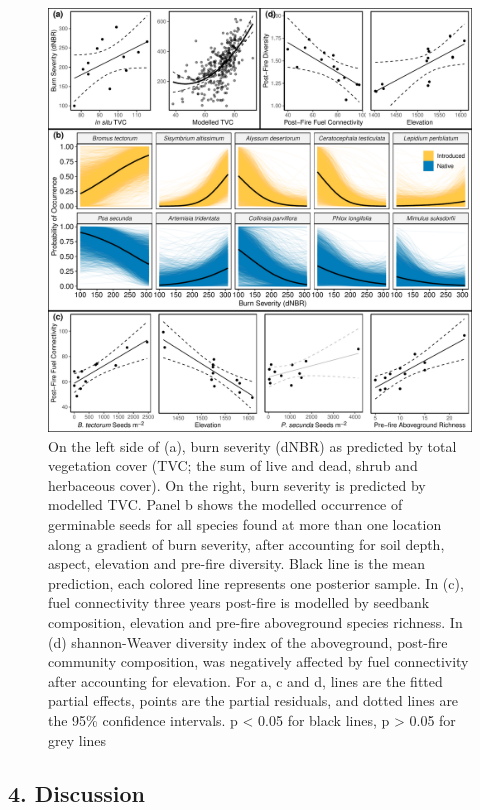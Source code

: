 \documentclass[
  12pt,
]{article}
\begin{document}
\begin{figure}
\centering
\includegraphics{images/big_plot.pdf}
\caption{On the left side of (a), burn severity (dNBR) as predicted by
total vegetation cover (TVC; the sum of live and dead, shrub and
herbaceous cover). On the right, burn severity is predicted by modelled
TVC. Panel b shows the modelled occurrence of germinable seeds for all
species found at more than one location along a gradient of burn
severity, after accounting for soil depth, aspect, elevation and
pre-fire diversity. Black line is the mean prediction, each colored line
represents one posterior sample. In (c), fuel connectivity three years
post-fire is modelled by seedbank composition, elevation and pre-fire
aboveground species richness. In (d) shannon-Weaver diversity index of
the aboveground, post-fire community composition, was negatively
affected by fuel connectivity after accounting for elevation. For a, c
and d, lines are the fitted partial effects, points are the partial
residuals, and dotted lines are the 95\% confidence intervals. p
\textless{} 0.05 for black lines, p \textgreater{} 0.05 for grey lines}
\end{figure}

\hypertarget{discussion}{%
\subsection{4. Discussion}\label{discussion}}
\end{document}
